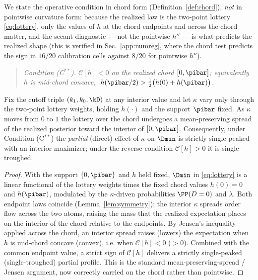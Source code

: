 We state the operative condition in chord form (Definition~\ref{def:chord}),
\emph{not} in pointwise curvature form: because the realized law is the
two-point lottery \eqref{eq:lottery}, only the values of $h$ at the chord
endpoints and across the chord matter, and the secant diagnostic --- not the
pointwise $h''$ --- is what predicts the realized shape (this is verified in
Sec.~\ref{app:numreg}, where the chord test predicts the sign in $16/20$
calibration cells against $8/20$ for pointwise $h''$).

\begin{quote}\itshape
Condition (C$^{\ast\ast}$).\quad
$\mathcal{C}[h] < 0$ on the realized chord $[0,\pibar]$; equivalently
$h$ is mid-chord concave, $\;h(\pibar/2) > \tfrac12\bigl(h(0)+h(\pibar)\bigr)$.
\end{quote}

\begin{lemma}
\label{lem:partial}
Fix the cutoff triple $(k_1,k_0,\kD)$ at any interior value and let $\kappa$
vary only through the two-point lottery weights, holding $h(\cdot)$ and the
support $\pibar$ fixed. As $\kappa$ moves from $0$ to $1$ the lottery over
the chord undergoes a mean-preserving spread of the realized posterior toward
the interior of $[0,\pibar]$. Consequently, under Condition
(C$^{\ast\ast}$) the \emph{partial} (direct) effect of $\kappa$ on $\Dmin$ is
strictly single-peaked with an interior maximizer; under the reverse
condition $\mathcal{C}[h]>0$ it is single-troughed.
\end{lemma}

\begin{proof}
With the support $\{0,\pibar\}$ and $h$ held fixed, $\Dmin$ in
\eqref{eq:lottery} is a linear functional of the lottery weights times the
fixed chord values $h(0)=0$ and $h(\pibar)$, modulated by the
$\kappa$-driven probabilities $\PP(D=0)$ and $\lambda$. Both endpoint laws
coincide (Lemma~\ref{lem:symmetry}); the interior $\kappa$ spreads order flow
across the two atoms, raising the mass that the realized expectation places
on the interior of the chord relative to the endpoints. By Jensen's
inequality applied across the chord, an interior spread raises (lowers) the
expectation when $h$ is mid-chord concave (convex), i.e. when
$\mathcal{C}[h]<0$ ($>0$). Combined with the common endpoint value, a strict
sign of $\mathcal{C}[h]$ delivers a strictly single-peaked (single-troughed)
partial profile. This is the standard mean-preserving-spread / Jensen
argument, now correctly carried on the chord rather than pointwise.
\end{proof}

